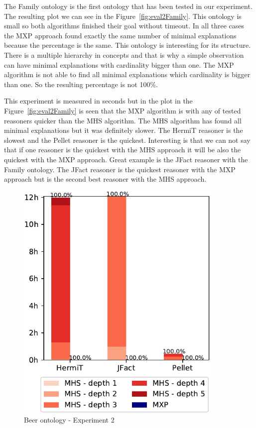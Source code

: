 \documentclass[12pt,a4paper]{article}
\begin{document}
The Family ontology is the first ontology that has been tested in our experiment. The resulting plot we can see in the Figure~\ref{fig:eval2Family}. This ontology is small so both algorithms finished their goal without timeout. In all three cases the MXP approach found exactly the same number of minimal explanations because the percentage is the same. This ontology is interesting for its structure. There is a multiple hierarchy in concepts and that is why a simple observation can have minimal explanations with cardinality bigger than one. The MXP algorithm is not able to find all minimal explanations which cardinality is bigger than one. So the resulting percentage is not 100\%. 

This experiment is measured in seconds but in the plot in the Figure~\ref{fig:eval2Family} is seen that the MXP algorithm is with any of tested reasoners quicker than the MHS algorithm. The MHS algorithm has found all minimal explanations but it was definitely slower. The HermiT reasoner is the slowest and the Pellet reasoner is the quickest. Interesting is that we can not say that if one reasoner is the quickest with the MHS approach it will be also the quickest with the MXP approach. Great example is the JFact reasoner with the Family ontology. The JFact reasoner is the quickest reasoner with the MXP approach but is the second best reasoner with the MHS approach.

\begin{figure}[H]
	\centering
	\includegraphics[width=10cm]{eval2Beer} 
	\caption{Beer ontology - Experiment 2}
	\label{fig:eval2Beer}
\end{figure}
\end{document}
